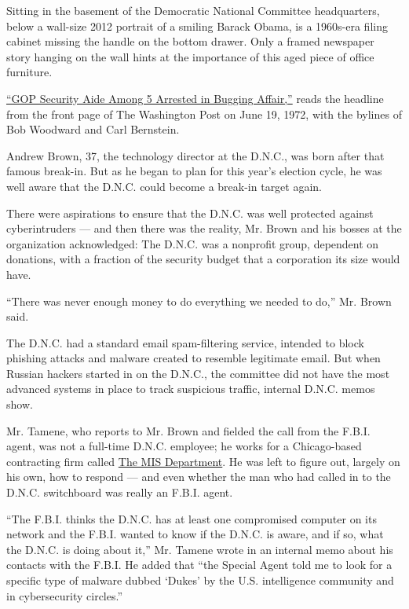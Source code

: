 Sitting in the basement of the Democratic National Committee
headquarters, below a wall-size 2012 portrait of a smiling Barack Obama,
is a 1960s-era filing cabinet missing the handle on the bottom drawer.
Only a framed newspaper story hanging on the wall hints at the
importance of this aged piece of office furniture.

\href{http://www.washingtonpost.com/wp-srv/local/longterm/tours/scandal/watergat.htm}{``GOP
Security Aide Among 5 Arrested in Bugging Affair,''} reads the headline
from the front page of The Washington Post on June 19, 1972, with the
bylines of Bob Woodward and Carl Bernstein.

Andrew Brown, 37, the technology director at the D.N.C., was born after
that famous break-in. But as he began to plan for this year's election
cycle, he was well aware that the D.N.C. could become a break-in target
again.

There were aspirations to ensure that the D.N.C. was well protected
against cyberintruders --- and then there was the reality, Mr. Brown and
his bosses at the organization acknowledged: The D.N.C. was a nonprofit
group, dependent on donations, with a fraction of the security budget
that a corporation its size would have.

``There was never enough money to do everything we needed to do,'' Mr.
Brown said.

The D.N.C. had a standard email spam-filtering service, intended to
block phishing attacks and malware created to resemble legitimate email.
But when Russian hackers started in on the D.N.C., the committee did not
have the most advanced systems in place to track suspicious traffic,
internal D.N.C. memos show.

Mr. Tamene, who reports to Mr. Brown and fielded the call from the
F.B.I. agent, was not a full-time D.N.C. employee; he works for a
Chicago-based contracting firm called
\href{https://web.archive.org/web/20160507204851/http://www.misdepartment.com/staff}{The
MIS Department}. He was left to figure out, largely on his own, how to
respond --- and even whether the man who had called in to the D.N.C.
switchboard was really an F.B.I. agent.

``The F.B.I. thinks the D.N.C. has at least one compromised computer on
its network and the F.B.I. wanted to know if the D.N.C. is aware, and if
so, what the D.N.C. is doing about it,'' Mr. Tamene wrote in an internal
memo about his contacts with the F.B.I. He added that ``the Special
Agent told me to look for a specific type of malware dubbed `Dukes' by
the U.S. intelligence community and in cybersecurity circles.''

